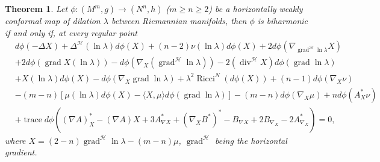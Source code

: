 \documentclass[12pt]{amsart}
\theoremstyle{plain}
\newtheorem{thm}{Theorem}
\theoremstyle{definition}
\begin{document}
\begin{thm}\label{prop1}
Let $\phi : (M^m ,g) \to (N^n ,h)$ ($m\geqslant n \geqslant 2$) be a horizontally
weakly conformal map of dilation $\lambda$ between Riemannian manifolds, then
$\phi$ is biharmonic if and only if, at every regular point
\begin{align*}
& d\phi(-\Delta X) + \Delta^{\mathcal{H}} (\ln\lambda) d\phi(X) + (n-2) \nu(\ln\lambda)d\phi(X)
  + 2 d\phi(\nabla_{\operatorname{grad}^{\mathcal{H}} \ln\lambda} X) \\
  &+ 2d\phi(\operatorname{grad} X(\ln\lambda))-d\phi(\nabla_{X} (\operatorname{grad}^{\mathcal{H}}\ln\lambda)) -2 (\operatorname{div}^{\mathcal{H}} X) d\phi(\operatorname{grad} \ln\lambda)\\
& + X(\ln \lambda)d\phi(X) 
 - d\phi (\nabla_{X} \operatorname{grad} \ln\lambda) + \lambda^2 \operatorname{Ricci}^{N}(d\phi(X))
 + (n-1) d\phi(\nabla_{X} \nu)  \\
 &- (m-n)[ \mu(\ln\lambda) d\phi(X) - \langle X, \mu \rangle d\phi(\operatorname{grad}\ln\lambda)]
-(m-n)d\phi (\nabla_{X} \mu)+ n d\phi(A^{*}_{X}\nu) \\
&+ \operatorname{trace} d\phi( (\nabla A)^{*}_{X} - (\nabla A)X + 3A^{*}_{\nabla X} + (\nabla_{X}
B^{*})^{*} - B_{\nabla X} + 2 B_{\nabla_{X}} -2 A^{*}_{\nabla_{X}} ) = 0,
\end{align*}
where $X= (2-n)\operatorname{grad}^{\mathcal{H}}\ln \lambda - (m-n)\mu$, $\operatorname{grad}^{\mathcal{H}}$ being the horizontal
gradient.
\end{thm}
\end{document}

